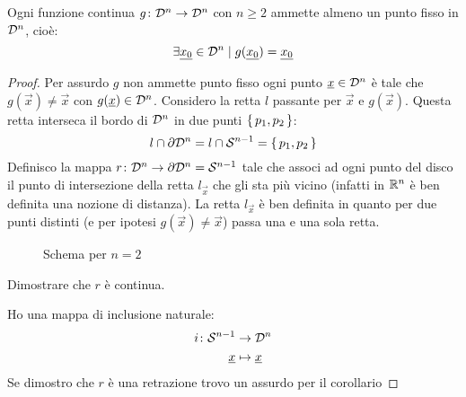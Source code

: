 \begin{theorem}
  Ogni funzione continua $ g \colon \mathcal{D}^{n} \to \mathcal{D}^{n} $ con $ n \geq 2 $ ammette almeno un punto fisso
  in $ \mathcal{D}^{n} $, cioè:
  \[
    \exists \underline{x_0} \in \mathcal{D}^{n} \; | \; g(\underline{x_0}) = \underline{x_0}
  \]
\end{theorem}
\begin{proof}
  Per assurdo $ g $ non ammette punto fisso ogni punto $ \underline{x} \in \mathcal{D}^{n} $ è
  tale che $ g(\vec{x}) \not = \vec{x} $ con  $ g(\underline{x}) \in \mathcal{D}^{n} $.
  Considero la retta $ l $ passante per $ \vec{x} $ e $ g(\vec{x}) $. Questa retta
  interseca il bordo di $ \mathcal{D}^{n} $ in due punti $ \set{p_1, p_2} $:
  \[
    l \cap \partial \mathcal{D}^{n} = l \cap \mathcal{S}^{n-1} = \set{p_1, p_2}
  \]
  Definisco la mappa $ r \colon \mathcal{D}^{n} \to \partial \mathcal{D}^{n} = \mathcal{S}^{n-1} $ tale che associ
  ad ogni punto del disco il punto di intersezione della retta $ l_{\vec{x}} $ che gli sta più
  vicino (infatti in $ \mathbb{R}^{n} $ è ben definita una nozione di distanza). La retta $ l_{\vec{x}} $
  è ben definita in quanto per due punti distinti (e per ipotesi  $ g(\vec{x}) \not = \vec{x} $)
  passa una e una sola retta.
  \begin{figure}[htbp]
    \centering
    \caption{Schema per $ n = 2 $}
    \label{fig:lez7:brouwer_proof_1}
  \end{figure}
  \begin{exercise}
    Dimostrare che $ r $ è continua.
  \end{exercise}
  Ho una mappa di inclusione naturale:
  \begin{align*}
      i \colon \mathcal{S}^{n-1} & \to \mathcal{D}^{n} \\
      \underline{x} & \mapsto \underline{x}
  \end{align*}
  Se dimostro che $ r $ è una retrazione trovo un assurdo per il corollario

\end{proof}
